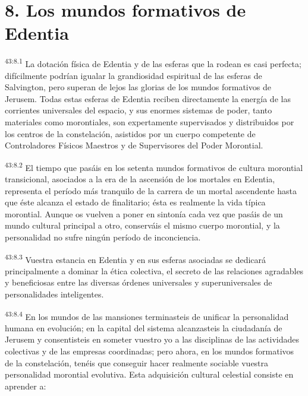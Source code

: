 \section*{8. Los mundos formativos de Edentia}
\par
\textsuperscript{43:8.1} La dotación física de Edentia y de las esferas que la rodean es casi perfecta; difícilmente podrían igualar la grandiosidad espiritual de las esferas de Salvington, pero superan de lejos las glorias de los mundos formativos de Jerusem. Todas estas esferas de Edentia reciben directamente la energía de las corrientes universales del espacio, y sus enormes sistemas de poder, tanto materiales como morontiales, son expertamente supervisados y distribuidos por los centros de la constelación, asistidos por un cuerpo competente de Controladores Físicos Maestros y de Supervisores del Poder Morontial.

\par
\textsuperscript{43:8.2} El tiempo que pasáis en los setenta mundos formativos de cultura morontial transicional, asociados a la era de la ascensión de los mortales en Edentia, representa el período más tranquilo de la carrera de un mortal ascendente hasta que éste alcanza el estado de finalitario; ésta es realmente la vida típica morontial. Aunque os vuelven a poner en sintonía cada vez que pasáis de un mundo cultural principal a otro, conserváis el mismo cuerpo morontial, y la personalidad no sufre ningún período de inconciencia.

\par
\textsuperscript{43:8.3} Vuestra estancia en Edentia y en sus esferas asociadas se dedicará principalmente a dominar la ética colectiva, el secreto de las relaciones agradables y beneficiosas entre las diversas órdenes universales y superuniversales de personalidades inteligentes.

\par
\textsuperscript{43:8.4} En los mundos de las mansiones terminasteis de unificar la personalidad humana en evolución; en la capital del sistema alcanzasteis la ciudadanía de Jerusem y consentisteis en someter vuestro yo a las disciplinas de las actividades colectivas y de las empresas coordinadas; pero ahora, en los mundos formativos de la constelación, tenéis que conseguir hacer realmente sociable vuestra personalidad morontial evolutiva. Esta adquisición cultural celestial consiste en aprender a:

